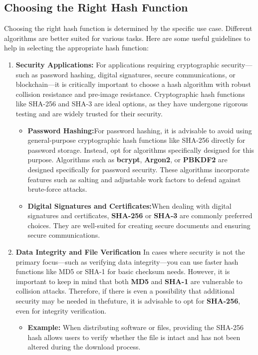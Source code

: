 \documentclass[11pt,a4paper]{article}
\begin{document}
    \subsection*{Choosing the Right Hash Function}
    Choosing the right hash function is determined by the specific use case. Different algorithms are better suited for various tasks. Here are some useful guidelines to help in selecting the appropriate hash function:
        \begin{enumerate}
            \item \textbf{Security Applications:}
            \newline
            For applications requiring cryptographic security—such as password hashing, digital signatures, secure communications, or blockchain—it is critically important to choose a hash algorithm with robust collision resistance and pre-image resistance. Cryptographic hash functions like SHA-256 and SHA-3 are ideal options, as they have undergone rigorous testing and are widely trusted for their security.
            \begin{itemize}
                \item \textbf{Password Hashing:}For password hashing, it is advisable to avoid using general-purpose cryptographic hash functions like SHA-256 directly for password storage. Instead, opt for algorithms specifically designed for this purpose. Algorithms such as \textbf{bcrypt}, \textbf{Argon2}, or \textbf{PBKDF2} are designed specifically for password security. These algorithms incorporate features such as salting and adjustable work factors to defend against brute-force attacks.

                \item \textbf{Digital Signatures and Certificates:}When dealing with digital signatures and certificates, \textbf{SHA-256} or \textbf{SHA-3} are commonly preferred choices. They are well-suited for creating secure documents and ensuring secure communications.

            \end{itemize}


            \item \textbf{Data Integrity and File Verification}
            \newline
            In cases where security is not the primary focus—such as verifying data integrity—you can use faster hash functions like MD5 or SHA-1 for basic checksum needs. However, it is important to keep in mind that both \textbf{MD5} and \textbf{SHA-1} are vulnerable to collision attacks. Therefore, if there is even a possibility that additional security may be needed in thefuture, it is advisable to opt for \textbf{SHA-256}, even for integrity verification.
                \begin{itemize}
                    \item \textbf{Example:} When distributing software or files, providing the SHA-256 hash allows users to verify whether the file is intact and has not been altered during the download process.


\end{itemize}
\end{enumerate}
\end{document}
